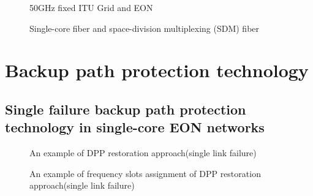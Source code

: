 \documentclass[a4paper,11pt]{report}
\begin{document}
    \begin{figure}[htbp]
    \begin{center}
    \end{center}
    \caption{50GHz fixed ITU Grid and EON}
    \label{figure:Fixed Grid and EON}
    \end{figure}
    
    \begin{figure}[htbp]
    \begin{center}
    \end{center}
    \caption{Single-core fiber and space-division multiplexing (SDM) fiber}
    \label{figure:EON and SDM}
    \end{figure}
    

    

\section{Backup path protection technology}
\subsection{Single failure backup path protection technology in single-core EON networks}
        \begin{figure}[!h]
        \begin{center}
        \end{center}
        \caption{An example of DPP restoration approach(single link failure)}
        \label{figure:DPP single}
        \end{figure}

        \begin{figure}[!h]
        \begin{center}
        \end{center}
        \caption{An example of frequency slots assignment of DPP restoration approach(single link failure)}
        \label{figure:DPP spectrum resources single}
        \end{figure}
\end{document}
